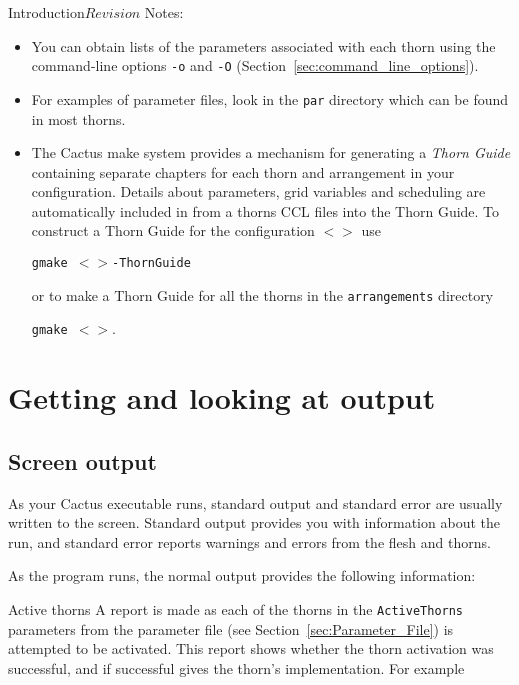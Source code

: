 \begin{cactuspart}{Introduction}{}{$Revision$}
Notes:

\begin{itemize}

\item{} You can obtain lists of the parameters associated with
each thorn using the command-line options \texttt{-o} and \texttt{-O}
(Section~\ref{sec:command_line_options}).

\item{} For examples of parameter files, look in the \texttt{par} directory
        which can be found in most thorns.

\item {}
The Cactus make system provides a mechanism for generating a
\textit{Thorn Guide} containing separate chapters for each thorn and
arrangement in your configuration. 
Details about parameters, grid variables and scheduling are
automatically included in from a thorns CCL files into the Thorn
Guide. To construct a Thorn Guide for the configuration
\texttt{$<$$>$} use

\texttt{gmake $<$$>$-ThornGuide}

or to make a Thorn Guide for all the thorns in the \texttt{arrangements} directory

\texttt{gmake $<$$>$}.

\end{itemize}



\chapter{Getting and looking at output}


\section{Screen output}

As your Cactus executable runs, standard output and standard error
are usually written to the screen. Standard output provides you
with information about the run, and standard error reports warnings
and errors from the flesh and thorns.

As the program runs, the normal output provides the following information:

\begin{Lentry}

\item [Active thorns]
        A report is made as each of the thorns in the \texttt{ActiveThorns}
parameters from the parameter file (see Section~\ref{sec:Parameter_File})
is attempted to be activated. This report
shows whether the thorn activation was successful, and if successful gives the
thorn's implementation. For example


\end{Lentry}
\end{cactuspart}
